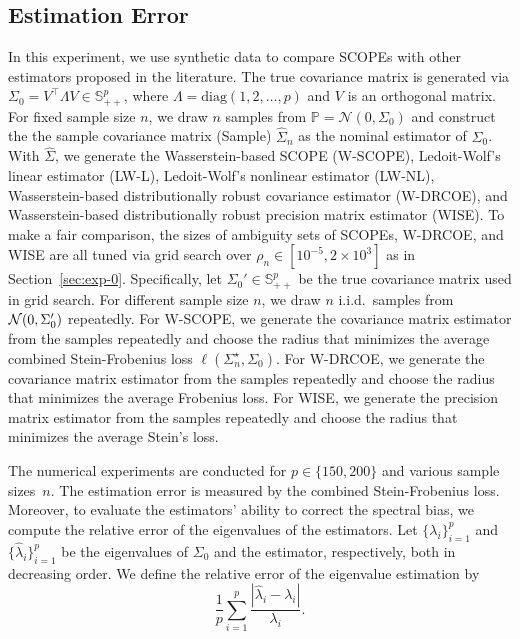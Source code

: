 \documentclass[11pt]{article}
\def\S{\mathbb{S}}
\newcommand{\opt}{^\star}
\def\diag{\mathrm{diag}}
\def\transpose{\top}
\def\S{\mathbb{S}}
\def\PD{{\S^p_{++}}}
\newcommand{\wh}{\widehat}
\begin{document}
\subsection{Estimation Error}\label{sec:exp-1}
In this experiment, we use synthetic data to compare SCOPEs with other estimators proposed in the literature. The true covariance matrix is generated via 
$\Sigma_0 = V^\transpose \Lambda V\in\PD$, where $\Lambda=\diag(1,2,\ldots,p)$ and $V$ is an orthogonal matrix.
For fixed sample size $n$, we draw $n$ samples from $\mathbb{P}=\mathcal{N}(0,\Sigma_0)$ and construct the the sample covariance matrix (Sample) $\wh\Sigma_n$ as the nominal estimator of $\Sigma_0$. With $\wh\Sigma$, we generate the Wasserstein-based SCOPE (W-SCOPE), Ledoit-Wolf's linear estimator (LW-L), Ledoit-Wolf's nonlinear estimator (LW-NL), Wasserstein-based distributionally robust covariance estimator (W-DRCOE), and Wasserstein-based distributionally robust precision matrix estimator (WISE). 
To make a fair comparison, the sizes of ambiguity sets of SCOPEs, W-DRCOE, and WISE are all tuned via grid search over $\rho_n\in [10^{-5}, 2\times 10^3]$ as in Section~\ref{sec:exp-0}. 
Specifically, let $\Sigma_0'\in\PD$ be the true covariance matrix used in grid search. For different sample size $n$, we draw $n$ i.i.d.~samples from ${\cal N}(0,\Sigma_0')$ repeatedly.
For W-SCOPE, we generate the covariance matrix estimator from the samples repeatedly and choose the radius that minimizes the average combined Stein-Frobenius loss $\ell(\Sigma\opt_n,\Sigma_0)$.
For W-DRCOE, we generate the covariance matrix estimator from the samples repeatedly and choose the radius that minimizes the average Frobenius loss. For WISE, we generate the precision matrix estimator from the samples repeatedly and choose the radius that minimizes the average Stein's loss.

The numerical experiments are conducted for $p\in\{150,200\}$ and various sample sizes~$n$. 
The estimation error is measured by the combined Stein-Frobenius loss. Moreover, to evaluate the estimators' ability to correct the spectral bias, we compute the relative error of the eigenvalues of the estimators. Let $\{\lambda_i\}_{i=1}^p$ and $\{\wh\lambda_i\}_{i=1}^p$ be the eigenvalues of $\Sigma_0$ and the estimator, respectively, both in decreasing order. We define the relative error of the eigenvalue estimation by 
\[
    \frac{1}{p}\sum_{i=1}^p \frac{|\wh\lambda_i-\lambda_i|}{\lambda_i}.
\]
\end{document}
